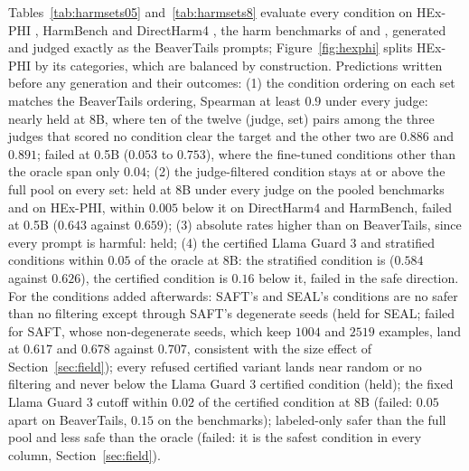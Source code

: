 \documentclass{article} %
\begin{document}
Tables~\ref{tab:harmsets05} and~\ref{tab:harmsets8} evaluate every condition on HEx-PHI \citep{qi2024finetuning}, HarmBench \citep{mazeika2024harmbench} and DirectHarm4 \citep{lyu2024directharm}, the harm benchmarks of \citet{zhang2026datashield} and \citet{larf2025}, generated and judged exactly as the BeaverTails prompts; Figure~\ref{fig:hexphi} splits HEx-PHI by its categories, which are balanced by construction. Predictions written before any generation and their outcomes: (1) the condition ordering on each set matches the BeaverTails ordering, Spearman at least $0.9$ under every judge: nearly held at 8B, where ten of the twelve (judge, set) pairs among the three judges that scored no condition clear the target and the other two are $0.886$ and $0.891$; failed at 0.5B ($0.053$ to $0.753$), where the fine-tuned conditions other than the oracle span only $0.04$; (2) the judge-filtered condition stays at or above the full pool on every set: held at 8B under every judge on the pooled benchmarks and on HEx-PHI, within $0.005$ below it on DirectHarm4 and HarmBench, failed at 0.5B ($0.643$ against $0.659$); (3) absolute rates higher than on BeaverTails, since every prompt is harmful: held; (4) the certified Llama Guard 3 and stratified conditions within $0.05$ of the oracle at 8B: the stratified condition is ($0.584$ against $0.626$), the certified condition is $0.16$ below it, failed in the safe direction. For the conditions added afterwards: SAFT's and SEAL's conditions are no safer than no filtering except through SAFT's degenerate seeds (held for SEAL; failed for SAFT, whose non-degenerate seeds, which keep $1004$ and $2519$ examples, land at $0.617$ and $0.678$ against $0.707$, consistent with the size effect of Section~\ref{sec:field}); every refused certified variant lands near random or no filtering and never below the Llama Guard 3 certified condition (held); the fixed Llama Guard 3 cutoff within $0.02$ of the certified condition at 8B (failed: $0.05$ apart on BeaverTails, $0.15$ on the benchmarks); labeled-only safer than the full pool and less safe than the oracle (failed: it is the safest condition in every column, Section~\ref{sec:field}).
\end{document}

